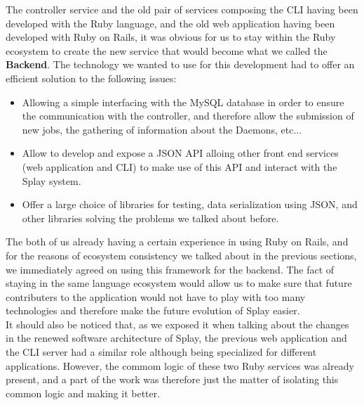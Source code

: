 \documentclass{eplmastersthesis}
\begin{document}
        The controller service and the old pair of services composing the CLI
        having been developed with the Ruby language, and the old web
        application having been developed with Ruby on Rails, it was obvious
        for us to stay within the Ruby ecosystem to create the new service
        that would become what we called the \textbf{Backend}. The technology
        we wanted to use for this development had to offer an efficient
        solution to the following issues:

        \begin{itemize}
          \item Allowing a simple interfacing with the MySQL database in order
          to ensure the communication with the controller, and therefore allow
          the submission of new jobs, the gathering of information about the
          Daemons, etc...
          \item Allow to develop and expose a JSON API alloing other front
          end services (web application and CLI) to make use of this API and
          interact with the Splay system.
          \item Offer a large choice of libraries for testing, data
          serialization using JSON, and other libraries solving the problems
          we talked about before.
        \end{itemize}

        The both of us already having a certain experience in using Ruby on
        Rails, and for the reasons of ecosystem consistency we talked about
        in the previous sections, we immediately agreed on using this
        framework for the backend. The fact of staying in the same language
        ecosystem would allow us to make sure that future contributers to
        the application would not have to play with too many technologies and
        therefore make the future evolution of Splay easier.\\
        It should also be noticed that, as we exposed it when talking about the
        changes in the renewed software architecture of Splay, the previous
        web application and the CLI server had a similar role although being
        specialized for different applications. However, the commom logic
        of these two Ruby services was already present, and a part of the
        work was therefore just the matter of isolating this common logic
        and making it better.\\
\end{document}
